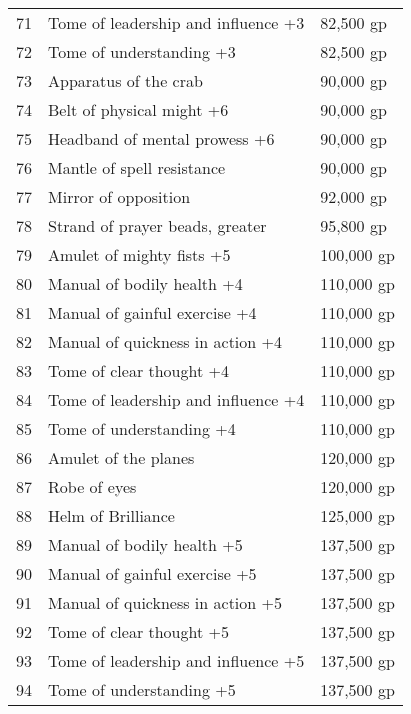 \begin{xtabular}{lll}
71  & Tome of leadership and influence +3            & 82,500 gp    \\
72  & Tome of understanding +3                       & 82,500 gp    \\
73  & Apparatus of the crab                          & 90,000 gp    \\
74  & Belt of physical might +6                      & 90,000 gp    \\
75  & Headband of mental prowess +6                  & 90,000 gp    \\
76  & Mantle of spell resistance                     & 90,000 gp    \\
77  & Mirror of opposition                           & 92,000 gp    \\
78  & Strand of prayer beads, greater                & 95,800 gp    \\
79  & Amulet of mighty fists +5                      & 100,000 gp   \\
80  & Manual of bodily health +4                     & 110,000 gp   \\
81  & Manual of gainful exercise +4                  & 110,000 gp   \\
82  & Manual of quickness in action +4               & 110,000 gp   \\
83  & Tome of clear thought +4                       & 110,000 gp   \\
84  & Tome of leadership and influence +4            & 110,000 gp   \\
85  & Tome of understanding +4                       & 110,000 gp   \\
86  & Amulet of the planes                           & 120,000 gp   \\
87  & Robe of eyes                                   & 120,000 gp   \\
88  & Helm of Brilliance                             & 125,000 gp   \\
89  & Manual of bodily health +5                     & 137,500 gp   \\
90  & Manual of gainful exercise +5                  & 137,500 gp   \\
91  & Manual of quickness in action +5               & 137,500 gp   \\
92  & Tome of clear thought +5                       & 137,500 gp   \\
93  & Tome of leadership and influence +5            & 137,500 gp   \\
94  & Tome of understanding +5                       & 137,500 gp   \\

\end{xtabular}
